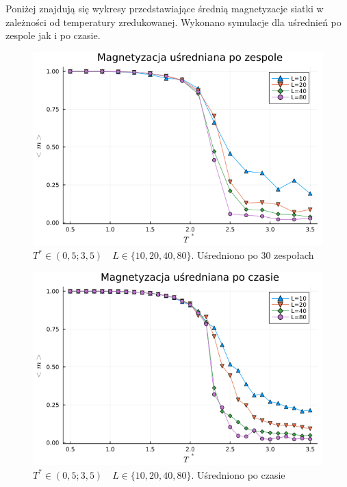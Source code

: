 \documentclass[12pt]{article}
\begin{document}
Poniżej znajdują się wykresy przedstawiające średnią magnetyzacje siatki w zależności od temperatury zredukowanej. Wykonano symulacje dla uśrednień po zespole jak i po czasie. 

\begin{figure}[H]
\centering
\includegraphics[scale=0.6]{../data/magnetizations/mag_temp.png}
\caption{$T^* \in (0,5; 3,5)\quad L \in \{10, 20, 40, 80\}$. Uśredniono po 30 zespołach}
\end{figure} 


\begin{figure}[H]
\centering
\includegraphics[scale=0.6]{../data/magnetizations/mag_time.png}
\caption{$T^* \in (0,5; 3,5)\quad L \in \{10, 20, 40, 80\}$. Uśredniono po czasie}
\end{figure} 
\end{document}

